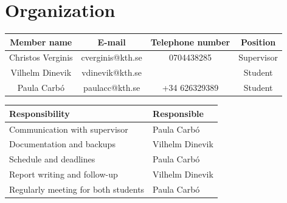 \documentclass{article}
\begin{document}
	\section{Organization}
	\begin{center}
		\begin{tabular}{|c|c|c|c|}
			Member name & E-mail & Telephone number & Position \\ \hline
			Christos Verginis & cverginis@kth.se & 0704438285 & Supervisor \\ \hline
			Vilhelm Dinevik & vdinevik@kth.se & & Student\\ \hline
			Paula Carbó & paulacc@kth.se & +34 626329389 & Student\\ \hline
		\end{tabular}
		
		\bigskip
		
		\begin{tabular}{|C{6cm}|C{4cm}|}
			Responsibility & Responsible \\ \hline
			Communication with supervisor & Paula Carbó \\ \hline
			Documentation and backups & Vilhelm Dinevik \\ \hline
			Schedule and deadlines & Paula Carbó \\ \hline
			Report writing and follow-up & Vilhelm Dinevik \\ \hline
			Regularly meeting for both students & Paula Carbó \\ \hline
		\end{tabular}
		
	\end{center}

	\bigskip
\end{document}
